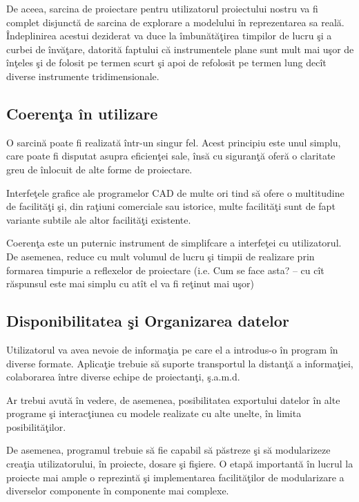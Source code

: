 De aceea, sarcina de proiectare pentru utilizatorul proiectului nostru va fi
complet disjunctă de sarcina de explorare a modelului în reprezentarea sa reală.
Îndeplinirea acestui deziderat va duce la îmbunătăţirea timpilor de lucru şi a
curbei de învăţare, datorită faptului că instrumentele plane sunt mult mai uşor
de înţeles şi de folosit pe termen scurt şi apoi de refolosit pe termen lung
decît diverse instrumente tridimensionale.

\subsection{Coerenţa în utilizare}

O sarcină poate fi realizată într-un singur fel. Acest principiu este unul
simplu, care poate fi disputat asupra eficienţei sale, însă cu siguranţă oferă o
claritate greu de înlocuit de alte forme de proiectare.

Interfeţele grafice ale programelor CAD de multe ori tind să ofere o multitudine
de facilităţi şi, din raţiuni comerciale sau istorice, multe facilităţi sunt de
fapt variante subtile ale altor facilităţi existente.

Coerenţa este un puternic instrument de simplifcare a interfeţei cu
utilizatorul. De asemenea, reduce cu mult volumul de lucru şi timpii de
realizare prin formarea timpurie a reflexelor de proiectare (i.e. Cum se face
asta? -- cu cît răspunsul este mai simplu cu atît el va fi reţinut mai uşor)

\subsection{Disponibilitatea şi Organizarea datelor}

Utilizatorul va avea nevoie de informaţia pe care el a introdus-o în program în
diverse formate. Aplicaţie trebuie să suporte transportul la distanţă a
informaţiei, colaborarea între diverse echipe de proiectanţi, ş.a.m.d.

Ar trebui avută în vedere, de asemenea, posibilitatea exportului datelor în alte
programe şi interacţiunea cu modele realizate cu alte unelte, în limita
posibilităţilor.

De asemenea, programul trebuie să fie capabil să păstreze şi să modularizeze 
creaţia utilizatorului, în proiecte, dosare şi fişiere. O etapă importantă în 
lucrul la proiecte mai ample o reprezintă şi implementarea facilităţilor de 
modularizare a diverselor componente în componente mai complexe.

